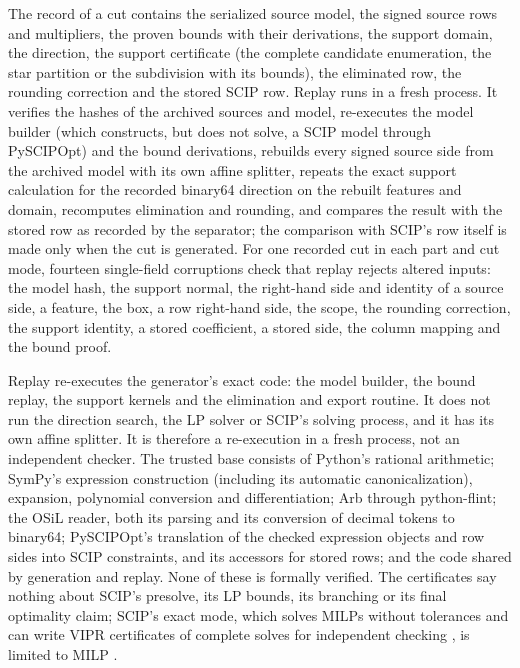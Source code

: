 The record of a cut contains the serialized source model, the signed source
rows and multipliers, the proven bounds with their derivations, the support
domain, the direction, the support certificate (the complete candidate
enumeration, the star partition or the subdivision with its bounds), the
eliminated row, the rounding correction and the stored SCIP row. Replay runs
in a fresh process. It verifies the hashes of the archived sources and model,
re-executes the model builder (which constructs, but does not solve, a SCIP
model through PySCIPOpt) and the bound derivations, rebuilds every signed
source side from the archived model with its own affine splitter, repeats the
exact support calculation for the recorded binary64 direction on the rebuilt
features and domain, recomputes elimination and rounding, and compares the
result with the stored row as recorded by the separator; the comparison with
SCIP's row itself is made only when the cut is generated. For one recorded cut in each part and cut mode,
fourteen single-field corruptions check that replay rejects altered inputs:
the model hash, the support normal, the right-hand side and identity of a
source side, a feature, the box, a row right-hand side, the scope, the
rounding correction, the support identity, a stored coefficient, a stored
side, the column mapping and the bound proof.

Replay re-executes the generator's exact code: the model builder, the bound
replay, the support kernels and the elimination and export routine. It does
not run the direction search, the LP solver or SCIP's solving process, and it
has its own affine splitter. It is therefore a re-execution in a fresh
process, not an independent checker. The trusted base consists of Python's
rational arithmetic; SymPy's expression construction (including its automatic
canonicalization), expansion, polynomial conversion and differentiation; Arb
through python-flint; the OSiL reader, both its parsing and its conversion of
decimal tokens to binary64; PySCIPOpt's translation of the checked expression
objects and row sides into SCIP constraints, and its accessors for stored
rows; and the code shared by generation and replay. None of these is formally
verified. The certificates say nothing about SCIP's presolve, its LP bounds,
its branching or its final optimality claim; SCIP's exact mode, which solves
MILPs without tolerances and can write VIPR certificates of complete solves
for independent checking \citep{CheungGleixnerSteffy2017,EiflerGleixner2023},
is limited to MILP \citep{SCIP10}.
